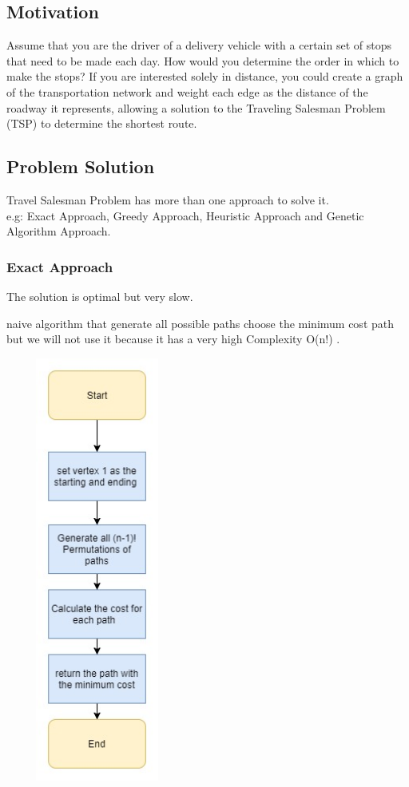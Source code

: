 \documentclass[12pt]{article}
\newcounter{subsubsubsection}[subsubsection]
\begin{document}
\subsection{ Motivation }
Assume that you are the driver of a delivery vehicle with a certain set of stops that need to be made each day. How would you determine the order in which to make the stops? If you are interested solely in distance, you could create a graph of the transportation network and weight each edge as the distance of the roadway it represents, allowing a solution to the Traveling Salesman Problem (TSP) to determine the shortest route.

\subsection{ Problem Solution }
Travel Salesman Problem has more than one approach to solve it.\\
e.g:  Exact Approach, Greedy Approach, Heuristic Approach and Genetic Algorithm Approach.

\subsubsection{ Exact Approach }
The solution is optimal but very slow.

naive algorithm that generate all possible paths choose the minimum cost path but we will not use it because it has a very high Complexity O(n!) .
\begin{center}
	\includegraphics[width=6cm,height=14cm]{./assets/flowchart/brute-force.png}\\
\end{center}
\end{document}
